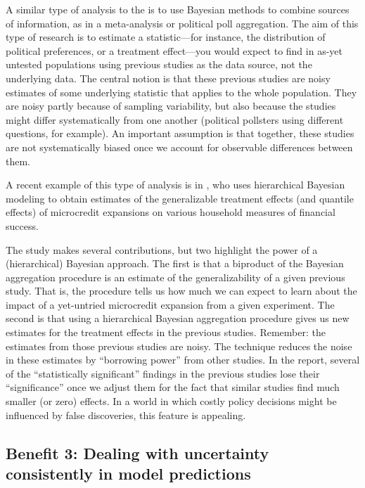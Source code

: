\documentclass[]{book}
\begin{document}
A similar type of analysis to the is to use Bayesian methods to combine
sources of information, as in a meta-analysis or political poll
aggregation. The aim of this type of research is to estimate a
statistic---for instance, the distribution of political preferences, or
a treatment effect---you would expect to find in as-yet untested
populations using previous studies as the data source, not the
underlying data. The central notion is that these previous studies are
noisy estimates of some underlying statistic that applies to the whole
population. They are noisy partly because of sampling variability, but
also because the studies might differ systematically from one another
(political pollsters using different questions, for example). An
important assumption is that together, these studies are not
systematically biased once we account for observable differences between
them.

A recent example of this type of analysis is in
\citep{meager2016aggregating}, who uses hierarchical Bayesian modeling
to obtain estimates of the generalizable treatment effects (and quantile
effects) of microcredit expansions on various household measures of
financial success.

The study makes several contributions, but two highlight the power of a
(hierarchical) Bayesian approach. The first is that a biproduct of the
Bayesian aggregation procedure is an estimate of the generalizability of
a given previous study. That is, the procedure tells us how much we can
expect to learn about the impact of a yet-untried microcredit expansion
from a given experiment. The second is that using a hierarchical
Bayesian aggregation procedure gives us new estimates for the treatment
effects in the previous studies. Remember: the estimates from those
previous studies are noisy. The technique reduces the noise in these
estimates by ``borrowing power'' from other studies. In the report,
several of the ``statistically significant'' findings in the previous
studies lose their ``significance'' once we adjust them for the fact
that similar studies find much smaller (or zero) effects. In a world in
which costly policy decisions might be influenced by false discoveries,
this feature is appealing.

\subsection*{Benefit 3: Dealing with uncertainty consistently in model
predictions}\label{benefit-3-dealing-with-uncertainty-consistently-in-model-predictions}
\end{document}
